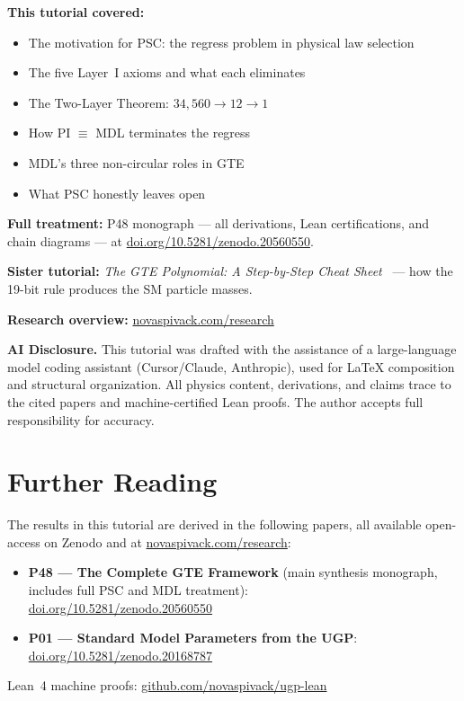 \documentclass[11pt,a4paper]{article}
\begin{document}
\bigskip
\begin{tcolorbox}[colback=boxblue,colframe=blue!40!black,
  title=Where to go next]
\textbf{This tutorial covered:}
\begin{itemize}[itemsep=2pt]
  \item The motivation for PSC: the regress problem in physical law selection
  \item The five Layer~I axioms and what each eliminates
  \item The Two-Layer Theorem: $34{,}560 \to 12 \to 1$
  \item How PI $\equiv$ MDL terminates the regress
  \item MDL's three non-circular roles in GTE
  \item What PSC honestly leaves open
\end{itemize}

\textbf{Full treatment:} P48 monograph — all derivations, Lean certifications, and
chain diagrams — at
\href{https://doi.org/10.5281/zenodo.20560550}{doi.org/10.5281/zenodo.20560550}.

\textbf{Sister tutorial:} \emph{The GTE Polynomial: A Step-by-Step Cheat Sheet}~\cite{SpivackTutorialPolynomial} —
how the 19-bit rule produces the SM particle masses.

\textbf{Research overview:} \href{https://novaspivack.com/research}{novaspivack.com/research}
\end{tcolorbox}

\bigskip
\noindent\textbf{AI Disclosure.}
This tutorial was drafted with the assistance of a large-language model coding
assistant (Cursor/Claude, Anthropic), used for LaTeX composition and structural
organization.  All physics content, derivations, and claims trace to the cited papers
and machine-certified Lean proofs.  The author accepts full responsibility for
accuracy.


\section*{Further Reading}
\begin{tcolorbox}[colback=orange!8,colframe=orange!50!black,
  title=\textbf{Primary Sources}]
The results in this tutorial are derived in the following papers,
all available open-access on Zenodo and at
\href{https://novaspivack.com/research}{novaspivack.com/research}:
\begin{itemize}
  \item \textbf{P48 --- The Complete GTE Framework} (main synthesis monograph, includes
        full PSC and MDL treatment):\\
        \href{https://doi.org/10.5281/zenodo.20560550}{doi.org/10.5281/zenodo.20560550}
  \item \textbf{P01 --- Standard Model Parameters from the UGP}:\\
        \href{https://doi.org/10.5281/zenodo.20168787}{doi.org/10.5281/zenodo.20168787}
\end{itemize}
Lean~4 machine proofs: \href{https://github.com/novaspivack/ugp-lean}{github.com/novaspivack/ugp-lean}
\end{tcolorbox}


\end{document}
